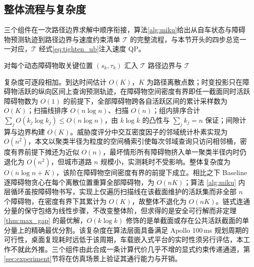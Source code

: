\documentclass[a4paper,zihao=5]{ctexart}
\theoremstyle{definition}
\begin{document}
\subsection{整体流程与复杂度}
\label{sec:method_algorithm}

三个组件在一次路径边界求解中顺序衔接，算法\ref{alg:miku}给出从自车状态与障碍物预测轨迹到路径边界与速度约束清单 $\mathcal{T}$ 的完整流程，与本节开头的四步总览一一对应，$\mathcal{T}$ 经式\eqref{eq:tighten_ub}注入速度 QP。

\begin{algorithm}[htbp]
\small
\caption{MIKU 多障碍物统一规划求解}
\label{alg:miku}
对每个动态障碍物取关键位置 $(s_k, \tau_k)$ 汇入 $\mathcal{T}$\;
\KwRet 路径边界与 $\mathcal{T}$
\end{algorithm}

复杂度可逐段相加。到达时间估计 $O(K)$，$K$ 为路径离散点数；时变投影只在障碍物活跃的纵向区间上查询预测轨迹，在障碍物空间密度有界即任一截面同时活跃障碍物数为 $O(1)$ 的前提下，全部障碍物跨各自活跃区间的累计采样数为 $O(K)$；扫描线排序 $O(n\log n)$、扫描 $O(n)$；组内排序合计 $\sum_j O(k_j\log k_j)\leq O(n\log n)$，由 $k\log k$ 的凸性与 $\sum_j k_j = n$ 保证；间隙计算与边界构建 $O(K)$。威胁度评分中交互密度因子的邻域统计朴素实现为 $O(n^2)$，本文以聚类半径为粒度的空间桶索引使每次邻域查询只访问相邻桶，密度有界前提下摊还为近似 $O(n)$，最坏情形所有障碍物挤入单一聚类半径内时仍退化为 $O(n^2)$，但城市道路 $n$ 规模小，实测耗时不受影响。整体复杂度为 $O(n\log n + K)$，该阶在障碍物空间密度有界的前提下成立。相比之下 Baseline 逐障碍物贪心在每个离散位置重算全部障碍物，为 $O(nK)$；算法 \ref{alg:miku} 内层循环虽按障碍物书写，实现上仅遍历扫描线在该截面维护的活跃集而非全部 $n$ 个障碍物，在密度有界下其累计为 $O(K)$，故整体不退化为 $O(nK)$。链式连通分量的保守包络为线性步骤，不改变整体阶，但求得的是安全可行解而非定理 \ref{thm:max_gap} 的最优解，$O(k\log k)$ 修饰的是单截面或存在公共活跃截面的单分量上的精确最优分割。该复杂度在算法层面具备满足 Apollo 100\,ms 规划周期的可行性，桌面复现耗时远低于该周期，车载嵌入式平台的实时性须另行评估，本工作不就此外推。三个组件由此合成一条计算代价几乎不增的显式约束传递通道，第\ref{sec:experiment}节将在仿真场景上验证其通行能力与开销。
\end{document}
